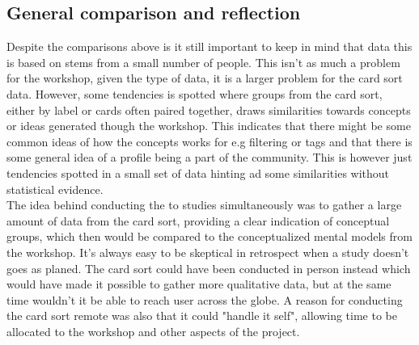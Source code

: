 \subsection*{General comparison and reflection}
\label{CompareGeneral}
Despite the comparisons above is it still important to keep in mind that data this is based on stems from a small number of people. This isn't as much a problem for the workshop, given the type of data, it is a larger problem for the card sort data. However, some tendencies is spotted where groups from the card sort, either by label or cards often paired together, draws similarities towards concepts or ideas generated though the workshop. This indicates that there might be some common ideas of how the concepts works for e.g filtering or tags and that there is some general idea of a profile being a part of the community. This is however just tendencies spotted in a small set of data hinting ad some similarities without statistical evidence. \\
The idea behind conducting the to studies simultaneously was to gather a large amount of data from the card sort, providing a clear indication of conceptual groups, which then would be compared to the conceptualized mental models from the workshop. It's always easy to be skeptical in retrospect when a study doesn't goes as planed. The card sort could have been conducted in person instead which would have made it possible to gather more qualitative data, but at the same time wouldn't it be able to reach user across the globe. A reason for conducting the card sort remote was also that it could "handle it self", allowing time to be allocated to the workshop and other aspects of the project.\\
